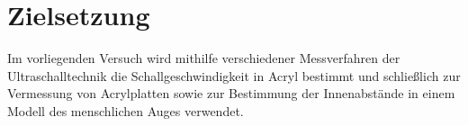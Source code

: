 \section{Zielsetzung}
\label{sec:Zielsetzung}
Im vorliegenden Versuch wird mithilfe verschiedener Messverfahren der Ultraschalltechnik die Schallgeschwindigkeit in Acryl bestimmt und schließlich zur Vermessung von Acrylplatten sowie zur Bestimmung der Innenabstände in einem Modell des menschlichen Auges verwendet.
